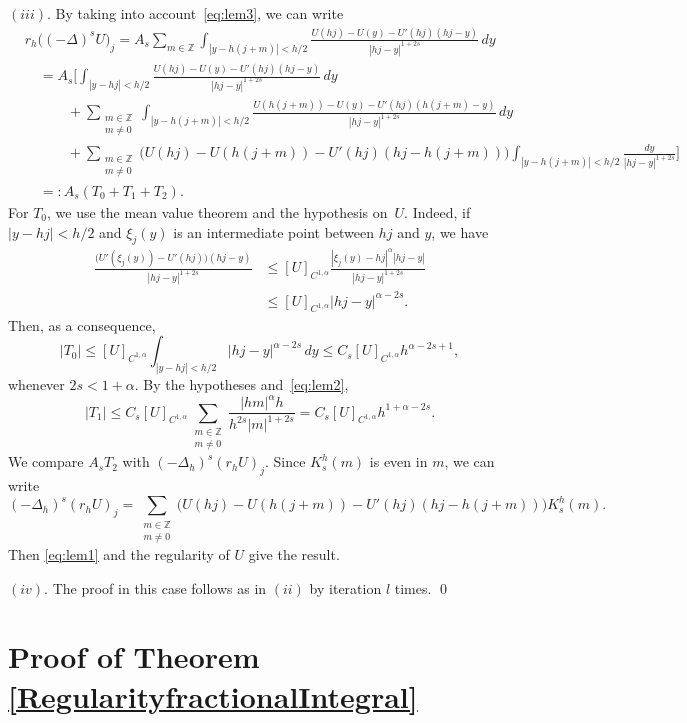 \documentclass[a4paper,11pt,reqno]{amsart}
\newcommand{\Z}{\mathbb{Z}}
\theoremstyle{definition}
\numberwithin{equation}{section}
\begin{document}
\noindent$(iii)$. By taking into account~\eqref{eq:lem3}, we can write
\begin{align*}
& r_h\big((-\Delta)^sU\big)_j
= A_{s}\sum_{m\in \Z}\int_{|y-h(j+m)|< h/2} \frac{U(hj)-U(y)-U'(hj)(hj-y)}{|hj-y|^{1+2s}}\,dy \\
& \quad= A_{s}\bigg[\int_{|y-hj|< h/2} \frac{U(hj)-U(y)-U'(hj)(hj-y)}{|hj-y|^{1+2s}}\,dy \\
&\qquad\quad+\sum_{\substack{m\in \Z\\ m\neq 0}}
\int_{|y-h(j+m)|< h/2} \frac{U(h(j+m))-U(y)-U'(hj)(h(j+m)-y)}{|hj-y|^{1+2s}}\,dy \\
& \qquad\quad+ \sum_{\substack{m\in \Z\\ m\neq 0}}
\big(U(hj)-U(h(j+m))-U'(hj)(hj-h(j+m))\big)
\int_{|y-h(j+m)|< h/2} \frac{dy}{|hj-y|^{1+2s}}\bigg] \\
& \quad=: A_s(T_0+T_1+T_2).
\end{align*}
For $T_0$, we use the mean value theorem and the hypothesis on~$U$.
Indeed, if $|y-hj|< h/2$ and $\xi_j(y)$ is an intermediate point between $hj$ and $y$, we have
\begin{align*}
\frac{\big(U'(\xi_j(y))-U'(hj)\big)(hj-y)}{|hj-y|^{1+2s}}
&\le [U]_{C^{1,\alpha}}\frac{|\xi_j(y)-hj|^{\alpha}|hj-y|}{|hj-y|^{1+2s}}\\
&\le [U]_{C^{1,\alpha}}|hj-y|^{\alpha-2s}.
\end{align*}
Then, as a consequence,
$$
|T_0|\le [U]_{C^{1,\alpha}}\int_{|y-hj|< h/2} |hj-y|^{\alpha-2s}\,dy
\le  C_s[U]_{C^{1,\alpha}}h^{\alpha-2s+1},
$$
whenever $2s<1+\alpha$.
By the hypotheses and~\eqref{eq:lem2},
\[
|T_1|\le C_s[U]_{C^{1,\alpha}} \sum_{\substack{m\in \Z\\ m\neq 0}}
\frac{|hm|^{\alpha}h}{h^{2s}|m|^{1+2s}} = C_s[U]_{C^{1,\alpha}}h^{1+\alpha-2s}.
\]
We compare $A_sT_2$ with $(-\Delta_h)^s(r_hU)_j$. Since $K^h_s(m)$ is even in $m$, we can write
\[
(-\Delta_h)^s(r_hU)_j=\sum_{\substack{m\in \Z\\ m\neq 0}} \big(U(hj)-U(h(j+m))-U'(hj)(hj-h(j+m))\big)K^h_s(m).
\]
Then \eqref{eq:lem1} and the regularity of $U$ give the result.

\noindent$(iv)$. The proof in this case follows as in $(ii)$ by iteration $l$ times.
\qed

\section{Proof of Theorem \ref{RegularityfractionalIntegral}}
\label{Section:JoseLuis}
\end{document}
